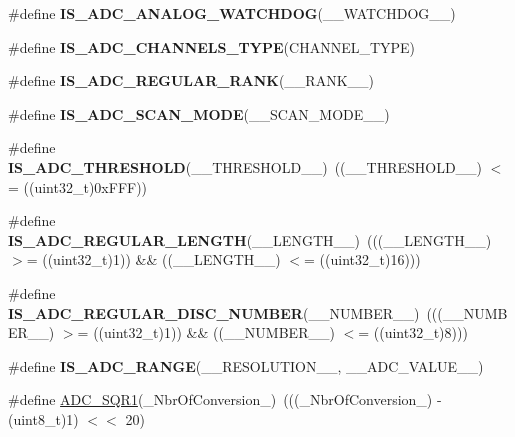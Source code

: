 \begin{DoxyCompactItemize}
\item 
\#define {\bfseries I\+S\+\_\+\+A\+D\+C\+\_\+\+A\+N\+A\+L\+O\+G\+\_\+\+W\+A\+T\+C\+H\+D\+OG}(\+\_\+\+\_\+\+W\+A\+T\+C\+H\+D\+O\+G\+\_\+\+\_\+)
\item 
\#define {\bfseries I\+S\+\_\+\+A\+D\+C\+\_\+\+C\+H\+A\+N\+N\+E\+L\+S\+\_\+\+T\+Y\+PE}(C\+H\+A\+N\+N\+E\+L\+\_\+\+T\+Y\+PE)
\item 
\#define {\bfseries I\+S\+\_\+\+A\+D\+C\+\_\+\+R\+E\+G\+U\+L\+A\+R\+\_\+\+R\+A\+NK}(\+\_\+\+\_\+\+R\+A\+N\+K\+\_\+\+\_\+)
\item 
\#define {\bfseries I\+S\+\_\+\+A\+D\+C\+\_\+\+S\+C\+A\+N\+\_\+\+M\+O\+DE}(\+\_\+\+\_\+\+S\+C\+A\+N\+\_\+\+M\+O\+D\+E\+\_\+\+\_\+)
\item 
\mbox{\label{group___a_d_c___private___macros_ga6dc496f5613fd61eac2522b60ff08f6f}} 
\#define {\bfseries I\+S\+\_\+\+A\+D\+C\+\_\+\+T\+H\+R\+E\+S\+H\+O\+LD}(\+\_\+\+\_\+\+T\+H\+R\+E\+S\+H\+O\+L\+D\+\_\+\+\_\+)~((\+\_\+\+\_\+\+T\+H\+R\+E\+S\+H\+O\+L\+D\+\_\+\+\_\+) $<$= ((uint32\+\_\+t)0x\+F\+F\+F))
\item 
\mbox{\label{group___a_d_c___private___macros_ga8c104fb685008a368026ba7008ed6dc8}} 
\#define {\bfseries I\+S\+\_\+\+A\+D\+C\+\_\+\+R\+E\+G\+U\+L\+A\+R\+\_\+\+L\+E\+N\+G\+TH}(\+\_\+\+\_\+\+L\+E\+N\+G\+T\+H\+\_\+\+\_\+)~(((\+\_\+\+\_\+\+L\+E\+N\+G\+T\+H\+\_\+\+\_\+) $>$= ((uint32\+\_\+t)1)) \&\& ((\+\_\+\+\_\+\+L\+E\+N\+G\+T\+H\+\_\+\+\_\+) $<$= ((uint32\+\_\+t)16)))
\item 
\mbox{\label{group___a_d_c___private___macros_ga45615cd8538535817c63f199708852d9}} 
\#define {\bfseries I\+S\+\_\+\+A\+D\+C\+\_\+\+R\+E\+G\+U\+L\+A\+R\+\_\+\+D\+I\+S\+C\+\_\+\+N\+U\+M\+B\+ER}(\+\_\+\+\_\+\+N\+U\+M\+B\+E\+R\+\_\+\+\_\+)~(((\+\_\+\+\_\+\+N\+U\+M\+B\+E\+R\+\_\+\+\_\+) $>$= ((uint32\+\_\+t)1)) \&\& ((\+\_\+\+\_\+\+N\+U\+M\+B\+E\+R\+\_\+\+\_\+) $<$= ((uint32\+\_\+t)8)))
\item 
\#define {\bfseries I\+S\+\_\+\+A\+D\+C\+\_\+\+R\+A\+N\+GE}(\+\_\+\+\_\+\+R\+E\+S\+O\+L\+U\+T\+I\+O\+N\+\_\+\+\_\+,  \+\_\+\+\_\+\+A\+D\+C\+\_\+\+V\+A\+L\+U\+E\+\_\+\+\_\+)
\item 
\#define \mbox{\hyperlink{group___a_d_c___private___macros_ga1958741688a480069df9ab5e15be93ca}{A\+D\+C\+\_\+\+S\+Q\+R1}}(\+\_\+\+Nbr\+Of\+Conversion\+\_\+)~(((\+\_\+\+Nbr\+Of\+Conversion\+\_\+) -\/ (uint8\+\_\+t)1) $<$$<$ 20)
$$
\end{DoxyCompactItemize}
